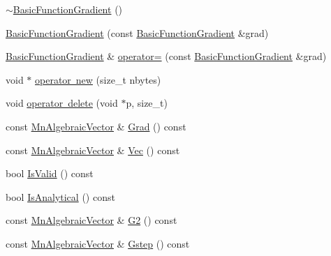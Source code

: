 \begin{DoxyCompactItemize}
\item 
\mbox{\hyperlink{classROOT_1_1Minuit2_1_1BasicFunctionGradient_a55ce8afeb4e559cf2d2c88aca167b524}{$\sim$\+Basic\+Function\+Gradient}} ()
\item 
\mbox{\hyperlink{classROOT_1_1Minuit2_1_1BasicFunctionGradient_a1193087c872c26bca560f069f2efc353}{Basic\+Function\+Gradient}} (const \mbox{\hyperlink{classROOT_1_1Minuit2_1_1BasicFunctionGradient}{Basic\+Function\+Gradient}} \&grad)
\item 
\mbox{\hyperlink{classROOT_1_1Minuit2_1_1BasicFunctionGradient}{Basic\+Function\+Gradient}} \& \mbox{\hyperlink{classROOT_1_1Minuit2_1_1BasicFunctionGradient_a1bf2f76bab802466b8697136fbea33e4}{operator=}} (const \mbox{\hyperlink{classROOT_1_1Minuit2_1_1BasicFunctionGradient}{Basic\+Function\+Gradient}} \&grad)
\item 
void $\ast$ \mbox{\hyperlink{classROOT_1_1Minuit2_1_1BasicFunctionGradient_a2b08ebb0074a43cfca91f74991c660d5}{operator new}} (size\+\_\+t nbytes)
\item 
void \mbox{\hyperlink{classROOT_1_1Minuit2_1_1BasicFunctionGradient_acc4585a778dae54497b4c4342a4dcd1e}{operator delete}} (void $\ast$p, size\+\_\+t)
\item 
const \mbox{\hyperlink{namespaceROOT_1_1Minuit2_a62ed97730a1ca8d3fbaec64a19aa11c9}{Mn\+Algebraic\+Vector}} \& \mbox{\hyperlink{classROOT_1_1Minuit2_1_1BasicFunctionGradient_a724c9b5e8c9cf8646eb362017158f52d}{Grad}} () const
\item 
const \mbox{\hyperlink{namespaceROOT_1_1Minuit2_a62ed97730a1ca8d3fbaec64a19aa11c9}{Mn\+Algebraic\+Vector}} \& \mbox{\hyperlink{classROOT_1_1Minuit2_1_1BasicFunctionGradient_a4c0d60175db412ac03313f824a055886}{Vec}} () const
\item 
bool \mbox{\hyperlink{classROOT_1_1Minuit2_1_1BasicFunctionGradient_a53963689701d2b3477e176920efdd3f9}{Is\+Valid}} () const
\item 
bool \mbox{\hyperlink{classROOT_1_1Minuit2_1_1BasicFunctionGradient_a6e4d212f4a441b9b58c6886b2c4c50ce}{Is\+Analytical}} () const
\item 
const \mbox{\hyperlink{namespaceROOT_1_1Minuit2_a62ed97730a1ca8d3fbaec64a19aa11c9}{Mn\+Algebraic\+Vector}} \& \mbox{\hyperlink{classROOT_1_1Minuit2_1_1BasicFunctionGradient_a7d06765b80da1a8baa4af474b503ec6c}{G2}} () const
\item 
const \mbox{\hyperlink{namespaceROOT_1_1Minuit2_a62ed97730a1ca8d3fbaec64a19aa11c9}{Mn\+Algebraic\+Vector}} \& \mbox{\hyperlink{classROOT_1_1Minuit2_1_1BasicFunctionGradient_a32966146618c6e1435f76dd851e7c014}{Gstep}} () const

\end{DoxyCompactItemize}
